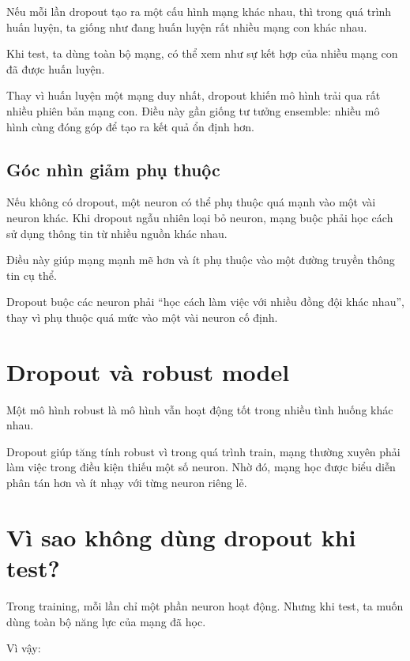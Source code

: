 \documentclass[12pt,a4paper]{report}
\begin{document}
Nếu mỗi lần dropout tạo ra một cấu hình mạng khác nhau, thì trong quá trình huấn luyện, ta giống như đang huấn luyện rất nhiều mạng con khác nhau.

Khi test, ta dùng toàn bộ mạng, có thể xem như sự kết hợp của nhiều mạng con đã được huấn luyện.

\begin{vidu}
Thay vì huấn luyện một mạng duy nhất, dropout khiến mô hình trải qua rất nhiều phiên bản mạng con. Điều này gần giống tư tưởng ensemble: nhiều mô hình cùng đóng góp để tạo ra kết quả ổn định hơn.
\end{vidu}

\subsection{Góc nhìn giảm phụ thuộc}

Nếu không có dropout, một neuron có thể phụ thuộc quá mạnh vào một vài neuron khác. Khi dropout ngẫu nhiên loại bỏ neuron, mạng buộc phải học cách sử dụng thông tin từ nhiều nguồn khác nhau.

Điều này giúp mạng mạnh mẽ hơn và ít phụ thuộc vào một đường truyền thông tin cụ thể.

\begin{ghinho}
Dropout buộc các neuron phải ``học cách làm việc với nhiều đồng đội khác nhau'', thay vì phụ thuộc quá mức vào một vài neuron cố định.
\end{ghinho}

\section{Dropout và robust model}

Một mô hình robust là mô hình vẫn hoạt động tốt trong nhiều tình huống khác nhau.

Dropout giúp tăng tính robust vì trong quá trình train, mạng thường xuyên phải làm việc trong điều kiện thiếu một số neuron. Nhờ đó, mạng học được biểu diễn phân tán hơn và ít nhạy với từng neuron riêng lẻ.

\section{Vì sao không dùng dropout khi test?}

Trong training, mỗi lần chỉ một phần neuron hoạt động. Nhưng khi test, ta muốn dùng toàn bộ năng lực của mạng đã học.

Vì vậy:
\end{document}
